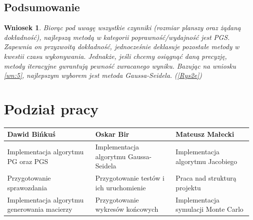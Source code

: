 \documentclass[10pt]{article}
\newtheorem{wn}{Wniosek}
\begin{document}
\subsection{Podsumowanie}
\begin{wn}
	Biorąc pod uwagę wszystkie czynniki (rozmiar planszy oraz żądaną dokładność), najlepszą metodą w kategorii poprawność/wydajność jest PGS. Zapewnia on przyzwoitą dokładność, jednocześnie deklasuje pozostałe metody w kwestii czasu wykonywania. Jednakże, jeśli chcemy osiągnąć daną precyzję, metody iteracyjne gwrantują pewność zwracanego wyniku. Bazując na wniosku \ref{wn:5}, najlepszym wyborem jest metoda Gaussa-Seidela. (\ref{Rys2e}) \label{wn:6}
\end{wn}
\section{Podział pracy}
\centering
	\begin{tabular}{| p{5cm} | p{5cm} | p{5cm} |}
		\hline
		\textbf{Dawid Bińkuś} & \textbf{Oskar Bir} & \textbf{Mateusz Małecki} \\ \hline
		Implementacja algorytmu PG oraz PGS & Implementacja algorytmu Gaussa-Seidela & Implementacja algorytmu Jacobiego \\ \hline
		Przygotowanie sprawozdania & Przygotowanie testów i ich uruchomienie & Praca nad strukturą projektu \\ \hline
		Implementacja algorytmu generowania macierzy & Przygotowanie wykresów końcowych &Implementacja symulacji Monte Carlo\\ \hline
		
		
		
	\end{tabular}
\end{document}
